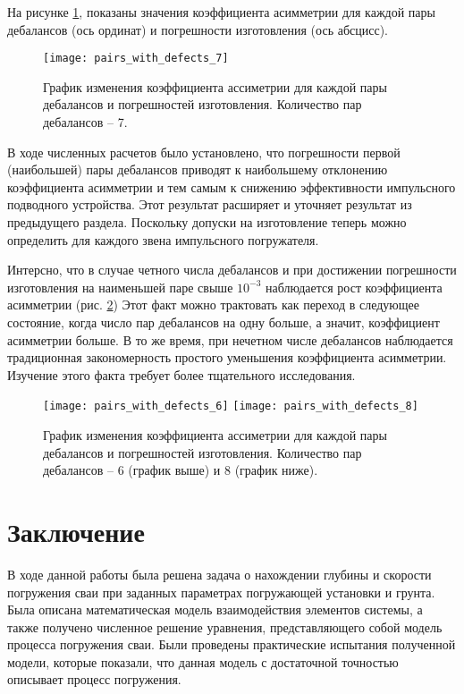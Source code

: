 На рисунке \ref{fig:pairs_with_defects_7}, показаны значения коэффициента асимметрии для каждой
пары дебалансов (ось ординат) и погрешности изготовления (ось абсцисс).

\begin{figure}[ht]
    \centering
    \texttt{[image: pairs\_with\_defects\_7]}
    \caption{График изменения коэффициента ассиметрии для каждой пары дебалансов и погрешностей изготовления.
    Количество пар дебалансов -- 7.}
    \label{fig:pairs_with_defects_7}
\end{figure}

В ходе численных расчетов было установлено, что погрешности первой (наибольшей) пары дебалансов приводят к наибольшему отклонению коэффициента
асимметрии и тем самым к снижению эффективности импульсного подводного устройства. Этот результат расширяет и уточняет результат из предыдущего раздела.
Поскольку допуски на изготовление теперь можно определить для каждого звена импульсного погружателя.

Интерсно, что в случае четного числа дебалансов и при достижении погрешности изготовления на наименьшей паре свыше $10^{-3}$ наблюдается рост
коэффициента асимметрии (рис. \ref{fig:pairs_with_defects_even}) Этот факт можно трактовать как переход в следующее состояние,
когда число пар дебалансов на одну больше, а значит, коэффициент асимметрии больше. В то же время, при нечетном числе дебалансов
наблюдается традиционная закономерность простого уменьшения коэффициента асимметрии.
Изучение этого факта требует более тщательного исследования.

\begin{figure}[ht]
    \centering
    \texttt{[image: pairs\_with\_defects\_6]}
    \texttt{[image: pairs\_with\_defects\_8]}
    \caption{График изменения коэффициента ассиметрии для каждой пары дебалансов и погрешностей изготовления.
    Количество пар дебалансов -- 6 (график выше) и 8 (график ниже).}
    \label{fig:pairs_with_defects_even}
\end{figure}

\clearpage

\section*{Заключение}

В ходе данной работы была решена задача о нахождении глубины и скорости погружения сваи при заданных параметрах погружающей
установки и грунта. Была описана математическая модель взаимодействия элементов системы, а также получено численное решение
уравнения, представляющего собой модель процесса погружения сваи. Были проведены практические испытания полученной модели,
которые показали, что данная модель с достаточной точностью описывает процесс погружения.

\clearpage


\nocite{*}

\printbibliography{}